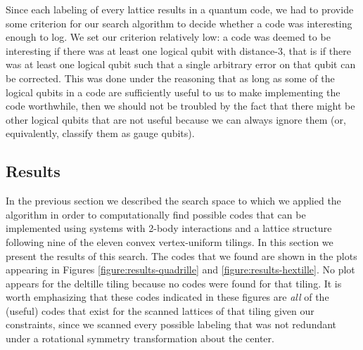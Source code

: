 \documentclass[twocolumn,showpacs,preprintnumbers,amsmath,amssymb,nofootinbib,pra,floatfix]{revtex4-1}
\begin{document}
Since each labeling of every lattice results in a quantum code, we had to provide some criterion for our search algorithm to decide whether a code was interesting enough to log.  We set our criterion relatively low:  a code was deemed to be interesting if there was at least one logical qubit with distance-3, that is if there was at least one logical qubit such that a single arbitrary error on that qubit can be corrected.  This was done under the reasoning that as long as some of the logical qubits in a code are sufficiently useful to us to make implementing the code worthwhile, then we should not be troubled by the fact that there might be other logical qubits that are not useful because we can always ignore them (or, equivalently, classify them as gauge qubits).
\subsection{Results} \label{sec:results}

In the previous section we described the search space to which we applied the algorithm in order to computationally find possible codes that can be implemented using systems with 2-body interactions and a lattice structure following nine of the eleven convex vertex-uniform tilings.  In this section we present the results of this search.  The codes that we found are shown in the plots appearing in Figures \ref{figure:results-quadrille} and \ref{figure:results-hextille}.  No plot appears for the deltille tiling because no codes were found for that tiling.  It is worth emphasizing that these codes indicated in these figures are \emph{all} of the (useful) codes that exist for the scanned lattices of that tiling given our constraints, since we scanned every possible labeling that was not redundant under a rotational symmetry transformation about the center.
\end{document}
